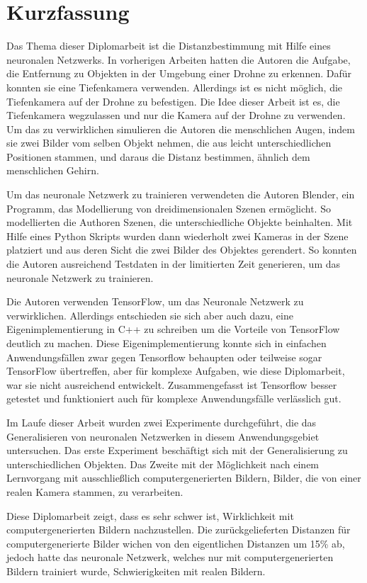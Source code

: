 \chapter{Kurzfassung}

Das Thema dieser Diplomarbeit ist die Distanzbestimmung mit Hilfe eines neuronalen Netzwerks. In vorherigen Arbeiten hatten die Autoren die Aufgabe, die Entfernung zu Objekten in der Umgebung einer Drohne zu erkennen. Dafür konnten sie eine Tiefenkamera verwenden. Allerdings ist es nicht möglich, die Tiefenkamera auf der Drohne zu befestigen. Die Idee dieser Arbeit ist es, die Tiefenkamera wegzulassen und nur die Kamera auf der Drohne zu verwenden. Um das zu verwirklichen simulieren die Autoren die menschlichen Augen, indem sie zwei Bilder vom selben Objekt nehmen, die aus leicht unterschiedlichen Positionen stammen, und daraus die Distanz bestimmen, ähnlich dem menschlichen Gehirn.

Um das neuronale Netzwerk zu trainieren verwendeten die Autoren Blender, ein Programm, das Modellierung von dreidimensionalen Szenen ermöglicht. So modellierten die Authoren Szenen, die unterschiedliche Objekte beinhalten. Mit Hilfe eines Python Skripts wurden dann wiederholt zwei Kameras in der Szene platziert und aus deren Sicht die zwei Bilder des Objektes gerendert. So konnten die Autoren ausreichend Testdaten in der limitierten Zeit generieren, um das neuronale Netzwerk zu trainieren.

Die Autoren verwenden TensorFlow, um das Neuronale Netzwerk zu verwirklichen. Allerdings entschieden sie sich aber auch dazu, eine Eigenimplementierung in C++ zu schreiben um die Vorteile von TensorFlow deutlich zu machen. Diese Eigenimplementierung konnte sich in einfachen Anwendungsfällen zwar gegen Tensorflow behaupten oder teilweise sogar TensorFlow übertreffen, aber für komplexe Aufgaben, wie diese Diplomarbeit, war sie nicht ausreichend entwickelt. Zusammengefasst ist Tensorflow besser getestet und funktioniert auch für komplexe Anwendungsfälle verlässlich gut.

Im Laufe dieser Arbeit wurden zwei Experimente durchgeführt, die das Generalisieren von neuronalen Netzwerken in diesem Anwendungsgebiet untersuchen. Das erste Experiment beschäftigt sich mit der Generalisierung zu unterschiedlichen Objekten. Das Zweite mit der Möglichkeit nach einem Lernvorgang mit ausschließlich computergenerierten Bildern, Bilder, die von einer realen Kamera stammen, zu verarbeiten.

Diese Diplomarbeit zeigt, dass es sehr schwer ist, Wirklichkeit mit computergenerierten Bildern nachzustellen. Die zurückgelieferten Distanzen für computergenerierte Bilder wichen von den eigentlichen Distanzen um 15\% ab, jedoch hatte das neuronale Netzwerk, welches nur mit computergenerierten Bildern trainiert wurde, Schwierigkeiten mit realen Bildern.


